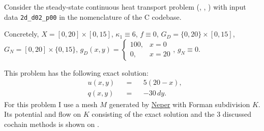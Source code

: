 \begin{example}
  Consider the steady-state continuous heat transport problem
  (,
   ,
   )
  with input data \verb|2d_d02_p00| in the nomenclature of the C codebase.

  Concretely, $X = [0, 20] \times [0, 15]$, $\kappa_1 \equiv 6$, $f \equiv 0$,
  $G_D = \{0, 20\} \times [0, 15]$, $G_N = [0, 20] \times \{0, 15\}$,
  $g_D(x, y) = \begin{cases} 100, & x = 0 \\ 0, & x = 20 \end{cases}$,
  $g_N \equiv 0$.

  This problem has the following exact solution:
  \begin{subequations}
    \begin{alignat}{3}
      & u(x, y) && = && 5 (20 - x), \\
      & q(x, y) && = && -30\, d y.
    \end{alignat}
  \end{subequations}
  For this problem I use a mesh $M$ generated by
  \href{https://neper.info/}{Neper} with Forman subdivision $K$.
  Its potential and flow on $K$ consisting of the exact solution and the $3$
  discussed cochain methods is shown on
  .
\end{example}
